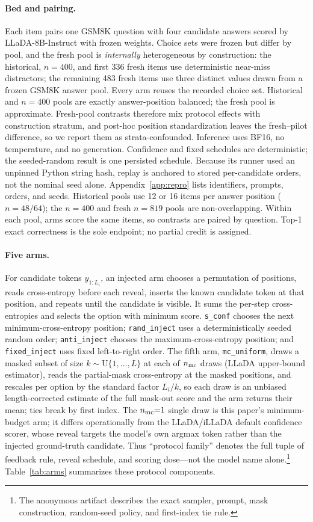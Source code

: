 \documentclass{article}
\newcommand{\sconf}{\texttt{s\_conf}}
\newcommand{\rinj}{\texttt{rand\_inject}}
\newcommand{\ainj}{\texttt{anti\_inject}}
\newcommand{\finj}{\texttt{fixed\_inject}}
\newcommand{\mcu}{\texttt{mc\_uniform}}
\begin{document}
\paragraph{Bed and pairing.}
Each item pairs one GSM8K question with four candidate answers scored by
LLaDA-8B-Instruct \citep{nie2025llada} with frozen weights.  Choice sets were
frozen but differ by pool, and the fresh pool is \emph{internally}
heterogeneous by construction: the historical, $n=400$, and first 336 fresh
items use deterministic near-miss distractors; the remaining 483 fresh items
use three distinct values drawn from a frozen GSM8K answer pool.  Every arm
reuses the recorded choice set.  Historical and $n=400$ pools are exactly
answer-position balanced; the fresh pool is approximate.  Fresh-pool contrasts
therefore mix protocol effects with construction stratum, and post-hoc position
standardization leaves the fresh--pilot difference, so we report them as
strata-confounded.  Inference uses BF16, no temperature,
and no generation.  Confidence and fixed schedules are deterministic; the
seeded-random result is one persisted schedule.  Because its runner used an
unpinned Python string hash, replay is anchored to stored per-candidate orders,
not the nominal seed alone.  Appendix~\ref{app:repro} lists identifiers,
prompts, orders, and seeds.  Historical pools use 12 or 16 items per answer
position ($n=48/64$); the $n=400$ and fresh $n=819$ pools are non-overlapping.
Within each pool, arms score the same items, so contrasts are paired by
question.  Top-1 exact correctness is the sole endpoint; no partial credit is
assigned.

\paragraph{Five arms.}
For candidate tokens $y_{1:L_i}$, an injected arm chooses a permutation of
positions, reads cross-entropy before each reveal, inserts the known candidate
token at that position, and repeats until the candidate is visible.  It sums
the per-step cross-entropies and selects the option with minimum score.
\sconf{} chooses the next minimum-cross-entropy position; \rinj{} uses a
deterministically seeded random order; \ainj{} chooses the maximum-cross-entropy
position; and \finj{} uses fixed left-to-right order.  The fifth arm, \mcu{},
draws a masked subset of size $k \sim \mathrm{U}\{1,\dots,L\}$ at each of
$n_{\rm mc}$ draws (LLaDA upper-bound estimator), reads the partial-mask
cross-entropy at the masked positions, and rescales per option by the standard
factor $L_i/k$, so each draw is an unbiased length-corrected estimate of the
full mask-out score and the arm returns their mean; ties break by first
index.  The $n_{\rm mc}{=}1$ single draw is this paper's minimum-budget arm;
it differs operationally from the LLaDA/iLLaDA default confidence scorer,
whose reveal targets the model's own argmax token rather than the injected
ground-truth candidate.  Thus ``protocol family''
denotes the full tuple of feedback rule, reveal schedule, and scoring dose---not
the model name alone.\footnote{The anonymous artifact describes the exact
sampler, prompt, mask construction, random-seed policy, and first-index tie
rule.}  Table~\ref{tab:arms} summarizes these protocol components.
\end{document}
